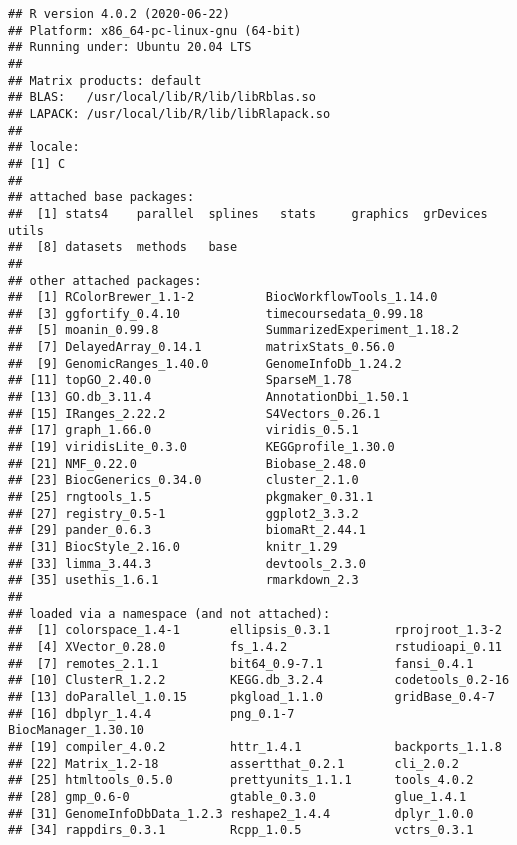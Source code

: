 \documentclass[9pt,a4paper,]{extarticle}
\begin{document}
\begin{verbatim}
## R version 4.0.2 (2020-06-22)
## Platform: x86_64-pc-linux-gnu (64-bit)
## Running under: Ubuntu 20.04 LTS
## 
## Matrix products: default
## BLAS:   /usr/local/lib/R/lib/libRblas.so
## LAPACK: /usr/local/lib/R/lib/libRlapack.so
## 
## locale:
## [1] C
## 
## attached base packages:
##  [1] stats4    parallel  splines   stats     graphics  grDevices utils    
##  [8] datasets  methods   base     
## 
## other attached packages:
##  [1] RColorBrewer_1.1-2          BiocWorkflowTools_1.14.0   
##  [3] ggfortify_0.4.10            timecoursedata_0.99.18     
##  [5] moanin_0.99.8               SummarizedExperiment_1.18.2
##  [7] DelayedArray_0.14.1         matrixStats_0.56.0         
##  [9] GenomicRanges_1.40.0        GenomeInfoDb_1.24.2        
## [11] topGO_2.40.0                SparseM_1.78               
## [13] GO.db_3.11.4                AnnotationDbi_1.50.1       
## [15] IRanges_2.22.2              S4Vectors_0.26.1           
## [17] graph_1.66.0                viridis_0.5.1              
## [19] viridisLite_0.3.0           KEGGprofile_1.30.0         
## [21] NMF_0.22.0                  Biobase_2.48.0             
## [23] BiocGenerics_0.34.0         cluster_2.1.0              
## [25] rngtools_1.5                pkgmaker_0.31.1            
## [27] registry_0.5-1              ggplot2_3.3.2              
## [29] pander_0.6.3                biomaRt_2.44.1             
## [31] BiocStyle_2.16.0            knitr_1.29                 
## [33] limma_3.44.3                devtools_2.3.0             
## [35] usethis_1.6.1               rmarkdown_2.3              
## 
## loaded via a namespace (and not attached):
##  [1] colorspace_1.4-1       ellipsis_0.3.1         rprojroot_1.3-2       
##  [4] XVector_0.28.0         fs_1.4.2               rstudioapi_0.11       
##  [7] remotes_2.1.1          bit64_0.9-7.1          fansi_0.4.1           
## [10] ClusterR_1.2.2         KEGG.db_3.2.4          codetools_0.2-16      
## [13] doParallel_1.0.15      pkgload_1.1.0          gridBase_0.4-7        
## [16] dbplyr_1.4.4           png_0.1-7              BiocManager_1.30.10   
## [19] compiler_4.0.2         httr_1.4.1             backports_1.1.8       
## [22] Matrix_1.2-18          assertthat_0.2.1       cli_2.0.2             
## [25] htmltools_0.5.0        prettyunits_1.1.1      tools_4.0.2           
## [28] gmp_0.6-0              gtable_0.3.0           glue_1.4.1            
## [31] GenomeInfoDbData_1.2.3 reshape2_1.4.4         dplyr_1.0.0           
## [34] rappdirs_0.3.1         Rcpp_1.0.5             vctrs_0.3.1           

\end{verbatim}
\end{document}
